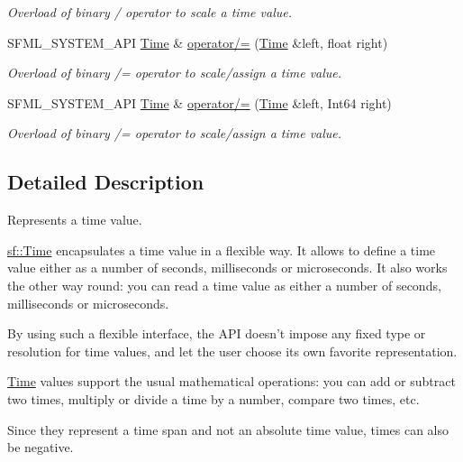\begin{DoxyCompactItemize}
\begin{DoxyCompactList}\small\item\em Overload of binary / operator to scale a time value. \end{DoxyCompactList}\item 
S\-F\-M\-L\-\_\-\-S\-Y\-S\-T\-E\-M\-\_\-\-A\-P\-I \hyperlink{classsf_1_1Time}{Time} \& \hyperlink{classsf_1_1Time_a9835490c54cab06492ec3aa9e9275ef9}{operator/=} (\hyperlink{classsf_1_1Time}{Time} \&left, float right)
\begin{DoxyCompactList}\small\item\em Overload of binary /= operator to scale/assign a time value. \end{DoxyCompactList}\item 
S\-F\-M\-L\-\_\-\-S\-Y\-S\-T\-E\-M\-\_\-\-A\-P\-I \hyperlink{classsf_1_1Time}{Time} \& \hyperlink{classsf_1_1Time_ad51871e3db77def834ae8688e64504ff}{operator/=} (\hyperlink{classsf_1_1Time}{Time} \&left, Int64 right)
\begin{DoxyCompactList}\small\item\em Overload of binary /= operator to scale/assign a time value. \end{DoxyCompactList}\end{DoxyCompactItemize}


\subsection{Detailed Description}
Represents a time value. 

\hyperlink{classsf_1_1Time}{sf\-::\-Time} encapsulates a time value in a flexible way. It allows to define a time value either as a number of seconds, milliseconds or microseconds. It also works the other way round\-: you can read a time value as either a number of seconds, milliseconds or microseconds.

By using such a flexible interface, the A\-P\-I doesn't impose any fixed type or resolution for time values, and let the user choose its own favorite representation.

\hyperlink{classsf_1_1Time}{Time} values support the usual mathematical operations\-: you can add or subtract two times, multiply or divide a time by a number, compare two times, etc.

Since they represent a time span and not an absolute time value, times can also be negative.

